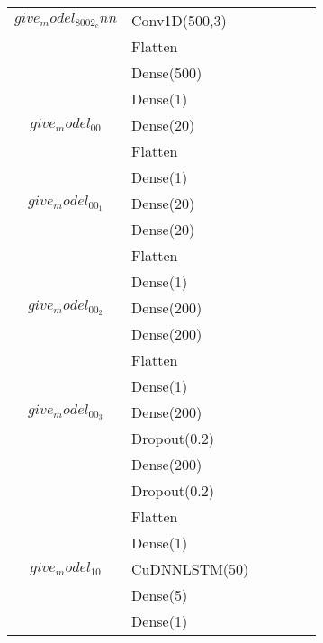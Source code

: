 \begin{longtable}{| c | m{0.58\linewidth} | r | m{0.1\linewidth} |}
    $give_model_8002_cnn$          & Conv1D(500,3)                 \\
                                   & Flatten                       \\
                                   & Dense(500)                    \\
                                   & Dense(1)                      \\ \hline


    $give_model_00$                & Dense(20)                     \\
                                   & Flatten                       \\
                                   & Dense(1)                      \\ \hline



    $give_model_00_1$              & Dense(20)                     \\
                                   & Dense(20)                     \\
                                   & Flatten                       \\
                                   & Dense(1)                      \\ \hline

    $give_model_00_2$              & Dense(200)                    \\
                                   & Dense(200)                    \\
                                   & Flatten                       \\
                                   & Dense(1)                      \\ \hline

    $give_model_00_3$              & Dense(200)                    \\
                                   & Dropout(0.2)                  \\
                                   & Dense(200)                    \\
                                   & Dropout(0.2)                  \\
                                   & Flatten                       \\
                                   & Dense(1)                      \\ \hline
    $give_model_10$                & CuDNNLSTM(50)                 \\
                                   & Dense(5)                      \\
                                   & Dense(1)                      \\ \hline


\end{longtable}
